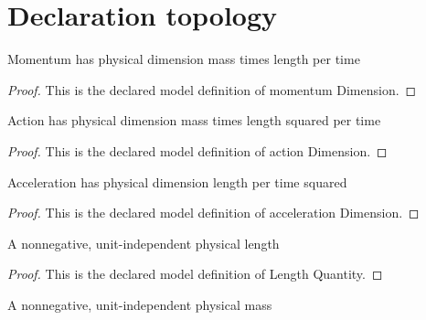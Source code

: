 \section{Declaration topology}
\begin{definition}
  \label{def:physics:phyx-mini-0654:phyxminiproblems-problemphyxmini0654-momentumdimension}
  Momentum has physical dimension mass times length per time
\end{definition}
\begin{proof}
  This is the declared model definition of momentum Dimension.
\end{proof}
\begin{definition}
  \label{def:physics:phyx-mini-0654:phyxminiproblems-problemphyxmini0654-actiondimension}
  Action has physical dimension mass times length squared per time
\end{definition}
\begin{proof}
  This is the declared model definition of action Dimension.
\end{proof}
\begin{definition}
  \label{def:physics:phyx-mini-0654:phyxminiproblems-problemphyxmini0654-accelerationdimension}
  Acceleration has physical dimension length per time squared
\end{definition}
\begin{proof}
  This is the declared model definition of acceleration Dimension.
\end{proof}
\begin{definition}
  \label{def:physics:phyx-mini-0654:phyxminiproblems-problemphyxmini0654-lengthquantity}
  A nonnegative, unit-independent physical length
\end{definition}
\begin{proof}
  This is the declared model definition of Length Quantity.
\end{proof}
\begin{definition}
  \label{def:physics:phyx-mini-0654:phyxminiproblems-problemphyxmini0654-massquantity}
  A nonnegative, unit-independent physical mass
\end{definition}
